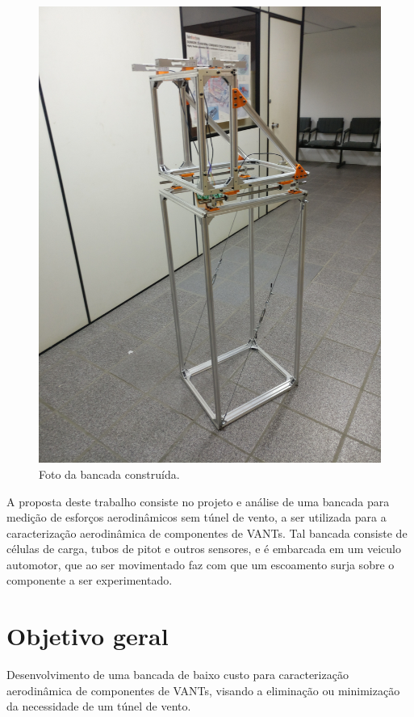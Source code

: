 \begin{figure}[!ht]
    \centering
    \includegraphics[width=.8\linewidth]{figuras/construcao/bancada_inteira.jpg}
    \caption{Foto da bancada construída\cite{autor}.}
    \label{fig:placeholder}
\end{figure}

A proposta deste trabalho consiste no projeto e análise de uma bancada para medição de esforços aerodinâmicos sem túnel de vento, a ser utilizada para a caracterização aerodinâmica de componentes de VANTs. Tal bancada consiste de células de carga, tubos de pitot e outros sensores, e é embarcada em um veiculo automotor, que ao ser movimentado faz com que um escoamento surja sobre o componente a ser experimentado.

\section{Objetivo geral}

Desenvolvimento de uma bancada de baixo custo para caracterização aerodinâmica de componentes de VANTs, visando a eliminação ou minimização da necessidade de um túnel de vento.
